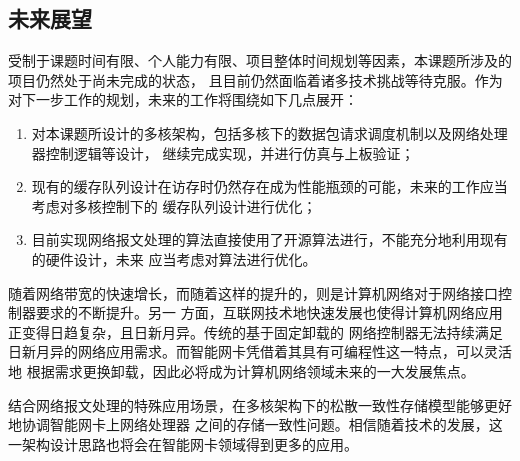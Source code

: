 \subsection{未来展望}
\label{section:conclusion_future}


受制于课题时间有限、个人能力有限、项目整体时间规划等因素，本课题所涉及的项目仍然处于尚未完成的状态，
且目前仍然面临着诸多技术挑战等待克服。作为对下一步工作的规划，未来的工作将围绕如下几点展开：

\begin{enumerate}
  \item 对本课题所设计的多核架构，包括多核下的数据包请求调度机制以及网络处理器控制逻辑等设计，
  继续完成实现，并进行仿真与上板验证；
  \item 现有的缓存队列设计在访存时仍然存在成为性能瓶颈的可能，未来的工作应当考虑对多核控制下的
  缓存队列设计进行优化；
  \item 目前实现网络报文处理的算法直接使用了开源算法进行，不能充分地利用现有的硬件设计，未来
  应当考虑对算法进行优化。
\end{enumerate}

随着网络带宽的快速增长，而随着这样的提升的，则是计算机网络对于网络接口控制器要求的不断提升。另一
方面，互联网技术地快速发展也使得计算机网络应用正变得日趋复杂，且日新月异。传统的基于固定卸载的
网络控制器无法持续满足日新月异的网络应用需求。而智能网卡凭借着其具有可编程性这一特点，可以灵活地
根据需求更换卸载，因此必将成为计算机网络领域未来的一大发展焦点。

结合网络报文处理的特殊应用场景，在多核架构下的松散一致性存储模型能够更好地协调智能网卡上网络处理器
之间的存储一致性问题。相信随着技术的发展，这一架构设计思路也将会在智能网卡领域得到更多的应用。
